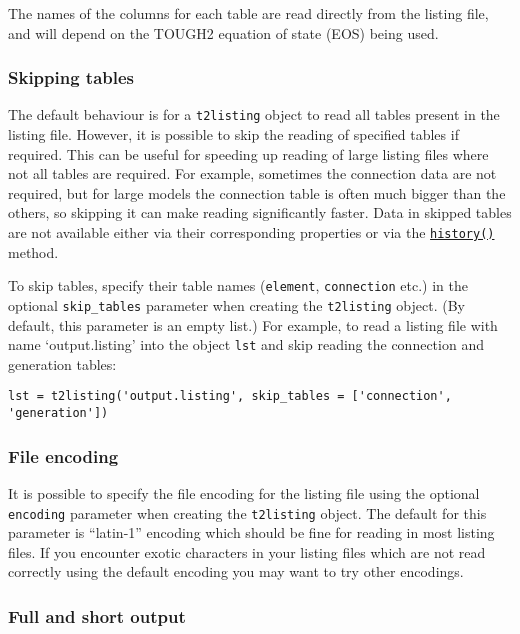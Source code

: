 The names of the columns for each table are read directly from the listing file, and will depend on the TOUGH2 equation of state (EOS) being used.

\subsubsection{Skipping tables}

The default behaviour is for a \texttt{t2listing} object to read all tables present in the listing file.  However, it is possible to skip the reading of specified tables if required.  This can be useful for speeding up reading of large listing files where not all tables are required.  For example, sometimes the connection data are not required, but for large models the connection table is often much bigger than the others, so skipping it can make reading significantly faster.  Data in skipped tables are not available either via their corresponding properties or via the \hyperref[sec:t2listing:history]{\texttt{history()}} method.

To skip tables, specify their table names (\texttt{element}, \texttt{connection} etc.) in the optional \texttt{skip\_tables} parameter when creating the \texttt{t2listing} object.  (By default, this parameter is an empty list.)  For example, to read a listing file with name `output.listing' into the object \texttt{lst} and skip reading the connection and generation tables:

\begin{lstlisting}
lst = t2listing('output.listing', skip_tables = ['connection', 'generation'])
\end{lstlisting}

\subsubsection{File encoding}

It is possible to specify the file encoding for the listing file using the optional \texttt{encoding} parameter when creating the \texttt{t2listing} object. The default for this parameter is ``latin-1'' encoding which should be fine for reading in most listing files. If you encounter exotic characters in your listing files which are not read correctly using the default encoding you may want to try other encodings.

\subsubsection{Full and short output}

